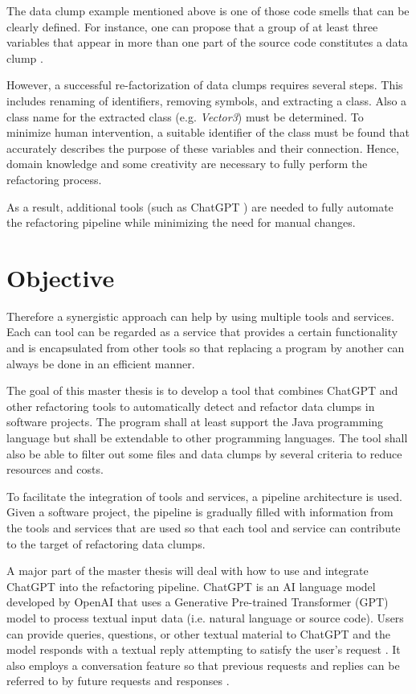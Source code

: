 The data clump example mentioned above is one of those code smells that can be clearly defined. For instance, one can propose that a group of at least three variables that appear in more than one part of the source code constitutes a data clump \cite{zhangImprovingPrecisionFowler2008}.


However, a successful re-factorization of data clumps requires several steps. This includes renaming of identifiers, removing symbols, and extracting a class. Also a class name for the extracted class (e.g. \textit{Vector3}) must be determined. To minimize human intervention, a suitable identifier of the class must be found that accurately describes the purpose of these variables and their connection. Hence, domain knowledge and some creativity are necessary to fully perform the refactoring process.

As a result,  additional tools (such as ChatGPT \cite{ChatGPT_url}) are needed to fully automate the refactoring pipeline while minimizing the need for manual changes. 




\section{Objective}
Therefore a synergistic approach can help by using multiple tools and services.  Each can tool can be regarded as  a service that provides a certain functionality and is encapsulated from other tools so that replacing a program by another can always be done in an efficient manner. 


The goal of this master thesis is to develop a tool that  combines ChatGPT and other refactoring tools  to automatically detect and refactor data clumps in software projects. The program  shall at least support the Java programming language but shall be extendable to  other programming languages. The tool shall also  be able to filter out some files and data clumps by several criteria to reduce resources and costs. 




To facilitate the integration of tools and services, a pipeline architecture is used. Given a software project, the pipeline is gradually filled with information from the tools and services that are used so that each tool and service can contribute to the target of refactoring data clumps.

A major part of the master thesis will deal with how to use and integrate ChatGPT into the refactoring pipeline. 
ChatGPT is an AI language model developed by OpenAI that uses a Generative Pre-trained Transformer (GPT) model to process textual input data (i.e. natural language or source code). Users can provide queries, questions, or other textual material to ChatGPT and the model responds with a textual reply attempting to satisfy the user's request \cite{yetistirenEvaluatingCodeQuality2023}. It also employs a conversation feature so that previous requests and replies can be referred to by future requests and responses \cite{sobania2023analysis}.

